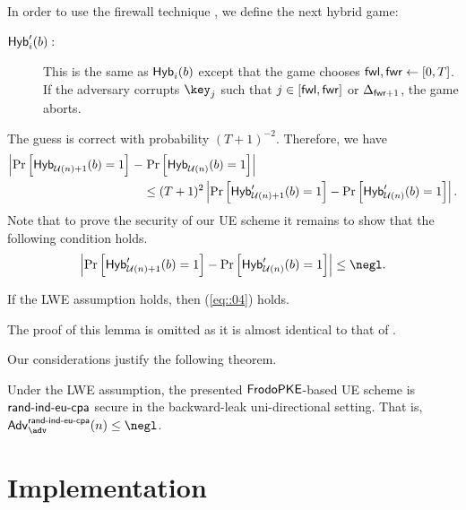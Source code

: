 \documentclass{fundam}
\begin{document}
In order to use the firewall technique \cite{jiang2020,nishimaki2022direction}, we define the next hybrid game:
\begin{description}
	\item[$\mathsf{Hyb}_{i}'(b):$] This is the same as $\mathsf{Hyb}_{i}(b)$ except that the game chooses $\mathsf{fwl},\mathsf{fwr}\gets [0,T]$. If the adversary corrupts $\key_{j}$ such that $j\in[\mathsf{fwl},\mathsf{fwr}]$ or $\Delta_{\mathsf{fwr}+1}$, the game aborts.
\end{description}
The guess is correct with probability $(T+1)^{-2}$. Therefore, we have
%
\begin{align*}
	\left|  \Pr\left[   \mathsf{Hyb}_{\mathcal{U}(n)+1}(b)=1\right]\right. - & \left. \Pr\left[   \mathsf{Hyb}_{\mathcal{U}(n)}(b)=1  \right]  \right| \\
	&\leq (T+1)^{2}	\left|  \Pr\left[   \mathsf{Hyb}_{\mathcal{U}(n)+1}'(b)=1\right] - \Pr\left[   \mathsf{Hyb}_{\mathcal{U}(n)}'(b)=1  \right]  \right|.
\end{align*}
%
Note that to prove the security of our UE scheme it remains to show that the following condition holds.  
\begin{align}\label{eq::04}
	\left|  \Pr\left[   \tx{Hyb}_{\mathcal{U}(n)+1}'(b)=1\right] - \Pr\left[   \tx{Hyb}_{\mathcal{U}(n)}'(b)=1  \right]  \right|\leq \negl.
\end{align}

\begin{lemma}
	If the LWE assumption holds, then (\ref{eq::04}) holds.
\end{lemma}	
%
The proof of this lemma is omitted as it is almost identical to that of \cite[Lemma 5.7]{nishimaki2022direction}.

\vspace{0.5cm}
Our considerations justify the following theorem.
\begin{theorem}
	Under the LWE assumption, the presented $\mathsf{FrodoPKE}$-based UE scheme is $\mathsf{rand{\text{-}} ind{\text{-}} eu{\text{-}} cpa}$	secure in the backward-leak uni-directional setting. That is, $\Adv_{\adv}^{\EUS}(n) \leq \negl$. 
\end{theorem}	


\section{Implementation}
\end{document}
